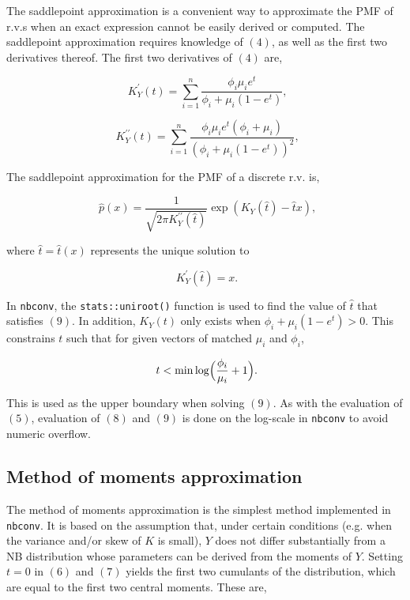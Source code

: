 \documentclass{article}
\begin{document}
The saddlepoint approximation is a convenient way to approximate the PMF of r.v.s when an exact expression cannot be easily derived or computed. The saddlepoint approximation requires knowledge of $(4)$, as well as the first two derivatives thereof. The first two derivatives of $(4)$ are,

\begin{equation}
	\phantom{,} K^{ \prime }_Y(t) = \sum_{i=1}^n \frac{ \phi_i \mu_i e^t }{ \phi_i + \mu_i ( 1-e^t ) } ,
\end{equation}

\begin{equation}
	\phantom{,} K^{ \prime \prime }_Y(t) = \sum_{i=1}^n \frac{ \phi_i \mu_i e^t ( \phi_i + \mu_i ) }{ ( \phi_i + \mu_i ( 1-e^t ) )^2  } ,
\end{equation}

The saddlepoint approximation for the PMF of a discrete r.v. \cite{butlerSaddlepointApproximationsApplications2007} is,

\begin{equation}
	\phantom{ , } 
	\hat{ p }(x) = \frac{ 1 }{ \sqrt { 2 \pi K_Y^{ \prime \prime } ( \hat{ t } ) } }  \exp( K_Y( \hat{ t } ) - \hat{ t } x ) ,
\end{equation}

where $ \hat{ t } = \hat{ t }(x) $  represents the unique solution to 

\begin{equation}
	\phantom{ . } K_Y^{ \prime }( \hat{ t } ) = x .
\end{equation} 

In \verb|nbconv|, the \verb|stats::uniroot()| function is used to find the value of $\hat{ t }$ that satisfies $(9)$. In addition, $K_Y(t)$ only exists when $  \phi_i + \mu_i ( 1-e^t ) > 0 $. This constrains $t$ such that for given vectors of matched $\mu_i$ and $\phi_i$,

$$ \phantom{ . } t < \min \log \Bigl ( \frac{ \phi_i }{ \mu_i } + 1 \Bigr ) . $$

This is used as the upper boundary when solving $(9)$. As with the evaluation of $(5)$, evaluation of $(8)$ and $(9)$ is done on the log-scale in \verb|nbconv| to avoid numeric overflow.

\subsection{Method of moments approximation}

The method of moments approximation is the simplest method implemented in \verb|nbconv|. It is based on the assumption that, under certain conditions (e.g. when the variance and/or skew of $K$ is small), $Y$ does not differ substantially from a NB distribution whose parameters can be derived from the moments of $Y$. Setting $t=0$ in $(6)$ and $(7)$ yields the first two cumulants of the distribution, which are equal to the first two central moments. These are,
\end{document}
